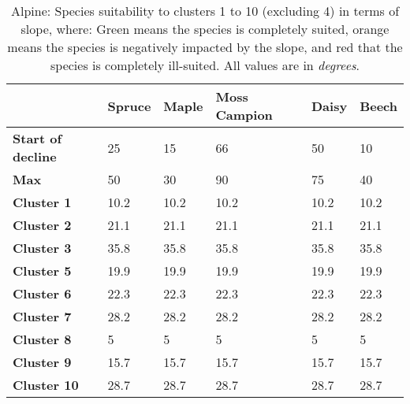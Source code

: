 \begin{table}[htb!]
  \centering
	    \begin{tabular}{|p{2cm}|p{2.5cm}|p{2.5cm}|p{2.5cm}|p{2.5cm}|p{2.5cm}|}
		\hline	
  	     & \textbf{Spruce} & \textbf{Maple} & \textbf{Moss Campion} & \textbf{Daisy} & \textbf{Beech}\\
  	    \hline	
		\textbf{Start of decline} & 
		25 & 
		15 & 
		66 & 
		50 & 
		10 \\
		\hline
		\textbf{Max} & 
		50 & 
		30 & 
		90 & 
		75 & 
		40 \\
		\hline
		\textbf{Cluster 1} & 
		\cellcolor{color_green}10.2 &
		\cellcolor{color_green}10.2 &
		\cellcolor{color_green}10.2 &
		\cellcolor{color_green}10.2 &
		\cellcolor{color_orange}10.2 \\
		\hline
		\textbf{Cluster 2} & 
		\cellcolor{color_orange}21.1 &
		\cellcolor{color_orange}21.1 &
		\cellcolor{color_green}21.1 &
		\cellcolor{color_green}21.1 &
		\cellcolor{color_orange}21.1 \\
		\hline
		\textbf{Cluster 3} & 
		\cellcolor{color_orange}35.8 & 
		\cellcolor{color_red}35.8 & 
		\cellcolor{color_green}35.8 & 
		\cellcolor{color_green}35.8 & 
		\cellcolor{color_orange}35.8\\
		\hline
		\textbf{Cluster 5} & 
		\cellcolor{color_green}19.9 & 
		\cellcolor{color_orange}19.9 & 
		\cellcolor{color_green}19.9 & 
		\cellcolor{color_green}19.9 & 
		\cellcolor{color_orange}19.9\\
		\hline
		\textbf{Cluster 6} & 
		\cellcolor{color_green}22.3 & 
		\cellcolor{color_orange}22.3 & 
		\cellcolor{color_green}22.3 & 
		\cellcolor{color_green}22.3 & 
		\cellcolor{color_orange}22.3\\
		\hline
		\textbf{Cluster 7} & 
		\cellcolor{color_orange}28.2 & 
		\cellcolor{color_orange}28.2 & 
		\cellcolor{color_green}28.2 & 
		\cellcolor{color_green}28.2 & 
		\cellcolor{color_orange}28.2\\
		\hline
		\textbf{Cluster 8} & 
		\cellcolor{color_green}5 & 
		\cellcolor{color_green}5 & 
		\cellcolor{color_green}5 & 
		\cellcolor{color_green}5 & 
		\cellcolor{color_green}5\\
		\hline
		\textbf{Cluster 9} & 
		\cellcolor{color_green}15.7 & 
		\cellcolor{color_orange}15.7 & 
		\cellcolor{color_green}15.7 & 
		\cellcolor{color_green}15.7 & 
		\cellcolor{color_orange}15.7\\
		\hline
		\textbf{Cluster 10} & 
		\cellcolor{color_orange}28.7 & 
		\cellcolor{color_orange}28.7 & 
		\cellcolor{color_green}28.7 & 
		\cellcolor{color_green}28.7 & 
		\cellcolor{color_orange}28.7\\
		\hline
		\end{tabular}
		\caption{Alpine: Species suitability to clusters 1 to 10 (excluding 4) in terms of slope, where: Green means the species is completely suited, orange means the species is negatively impacted by the slope, and red that the species is completely ill-suited. All values are in \textit{degrees}.}
	  \label{tab:results_alpine_species_slope_suitability}
\end{table}

